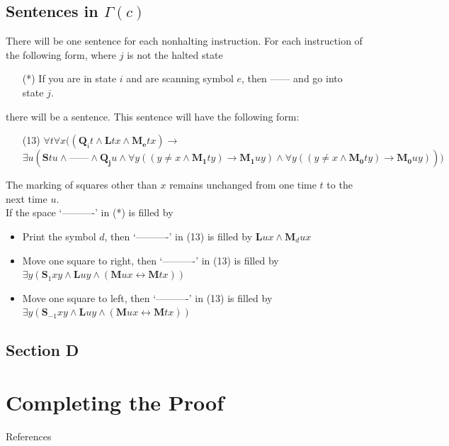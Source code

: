 \documentclass[
11pt,notheorems,hyperref={pdfauthor=whatever}
]{beamer}
\begin{document}
\subsection{Sentences in $\Gamma(c)$}
\begin{frame}
There will be one sentence for each nonhalting instruction. For each instruction of the following form, where $j$ is not the halted state
\vspace{1em}
\begin{enumerate}
    \item[(*)] If you are in state $i$ and are scanning symbol $e$, then ------ and go into state $j$.
\end{enumerate}
\vspace{1em}
there will be a sentence. This sentence will have the following form:
\vspace{1em}
\begin{enumerate}
    \item[(13)] $\forall t\forall x((\pmb{Q}_i t \wedge \pmb{L}tx \wedge \pmb{M_e}tx)\to$\\$\exists u(\pmb{S}tu\wedge \text{------} \wedge \pmb{Q_j}u \wedge \forall y((y\neq x \wedge \pmb{M_1}ty)\to\pmb{M_1}uy)\wedge\forall y((y\neq x\wedge \pmb{M_0}ty)\to\pmb{M_0}uy)))$
\end{enumerate}
\vspace{1em}
The marking of squares other than $x$ remains unchanged from one time $t$ to the next time $u$.\\
If the space ‘——----’ in (*) is filled by
\begin{itemize}
    \item Print the symbol $d$, then ‘——----’ in (13) is filled by $\pmb{L}ux \wedge \pmb{M}_d ux$
    \item Move one square to right, then ‘——----’ in (13) is filled by $\exists y(\pmb{S}_1 xy \wedge \pmb{L}uy \wedge (\pmb{M}ux\leftrightarrow\pmb{M}tx))$
    \item Move one square to left, then ‘——----’ in (13) is filled by $\exists y(\pmb{S}_{-1} xy \wedge \pmb{L}uy \wedge (\pmb{M}ux\leftrightarrow\pmb{M}tx))$
\end{itemize}
\end{frame}

\subsection{Section D}
\begin{frame}
    
\end{frame}

\section{Completing the Proof}
\begin{frame}
\end{frame}

\begin{frame}[allowframebreaks]{References}
    \printbibliography
\end{frame}
\end{document}
